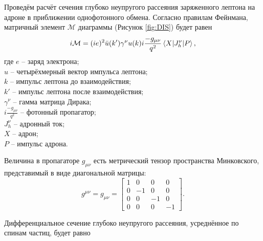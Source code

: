 \documentclass{extreport}
\begin{document}
Проведём расчёт сечения глубоко неупругого рассеяния заряженного лептона на адроне в приближении однофотонного обмена. Согласно правилам Фейнмана, матричный элемент $\mathcal{M}$ диаграммы (Рисунок \ref{fig:DIS}) будет равен
\begin{equation}
	i\mathcal{M} = (ie)^2 \bar{u}(k')\gamma^\nu u(k) i \frac{-g_{\mu\nu}}{q^2} \braket{X | J_h^\nu | P},
\end{equation}
где $e$ -- заряд электрона; \\ $u$ -- четырёхмерный вектор импульса лептона; \\ $k$ -- импульс лептона до взаимодействия; \\ $k'$ -- импульс лептона после взаимодействия; \\ $\gamma^\nu$ -- гамма матрица Дирака; \\ $i \frac{-g_{\mu\nu}}{q^2}$ -- фотонный пропагатор; \\ $ J_h^\nu $ -- адронный ток; \\ $X$ -- адрон; \\ $P$ -- импульс адрона. 

Величина в пропагаторе $g_{\mu\nu}$ есть метрический тензор пространства Минковского, представимый в виде диагональной матрицы:
\begin{equation}
	g^{\mu\nu} = g_{\mu\nu} = \begin{bmatrix} 1&0&0&0\\0&-1&0&0\\0&0&-1&0\\0&0&0&-1 \end{bmatrix}.
\end{equation}

Дифференциальное сечение глубоко неупругого рассеяния, усреднённое по спинам частиц, будет равно
\end{document}
